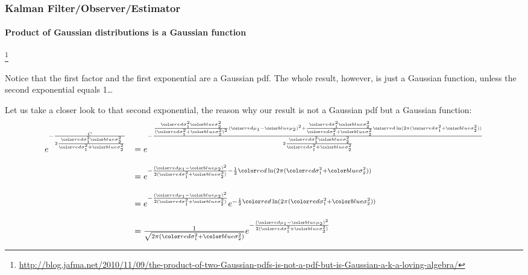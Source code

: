 \documentclass{beamer}
\newenvironment{changemargin}[2]
	{
	  	\begin{list}{}
		{
			\setlength{\topsep}{0pt}%
			\setlength{\leftmargin}{#1}%
			\setlength{\rightmargin}{#2}%
			\setlength{\listparindent}{\parindent}%
			\setlength{\itemindent}{\parindent}%
			\setlength{\parsep}{\parskip}%
		}
	  	\item[]
		}
		{\end{list}
	}
\begin{document}
\begin{frame}[plain]
\frametitle{Kalman Filter/Observer/Estimator}
\framesubtitle{Product of Gaussian distributions is a Gaussian function}

\footnote{\tiny\hspace{-0.23in} \hspace{-0.25in}
\href{http://blog.jafma.net/2010/11/09/the-product-of-two-Gaussian-pdfs-is-not-a-pdf-but-is-Gaussian-a-k-a-loving-algebra/}{http://blog.jafma.net/2010/11/09/the-product-of-two-Gaussian-pdfs-is-not-a-pdf-but-is-Gaussian-a-k-a-loving-algebra/}}
\begin{changemargin}{-1.35in}{0in}
\scriptsize
Notice that the first factor and the first exponential are a Gaussian pdf. The whole result, however, is just a Gaussian function, unless the second exponential equals 1…

Let us take a closer look to that second exponential, the reason why our result is not a Gaussian pdf but a Gaussian function:
\begin{equation*}
\begin{array}{rlllllll}
e^{- \frac {C}{2 \frac{\varone \vartwo}{\varone + \vartwo}} }&=   e^{- \frac { \frac { \varone \vartwo }{ (\varone + \vartwo)^2 } ({\muone} - {\mutwo} )^2+\frac { \varone \vartwo }{ \varone + \vartwo } \myalpha }        {2 \frac{\varone \vartwo}{\varone + \vartwo}} }\\\\
&=e^{- \frac { ({\muone} - {\mutwo} )^2 }{ 2 (\varone + \vartwo) }         - \frac{1}{2} \myalpha       } \\\\
&=   e^{- \frac { ({\muone} - {\mutwo} )^2 }{ 2( \varone + \vartwo )} }   e^{- \frac{1}{2} \myalpha } \\\\
&= \frac {1}{ \sqrt{2 \pi (\varone + \vartwo)} }   e^{- \frac { ({\muone} - {\mutwo} )^2 }{ 2(\varone + \vartwo) } }
\end{array}
\end{equation*}
\end{changemargin}
\end{frame}
\end{document}
